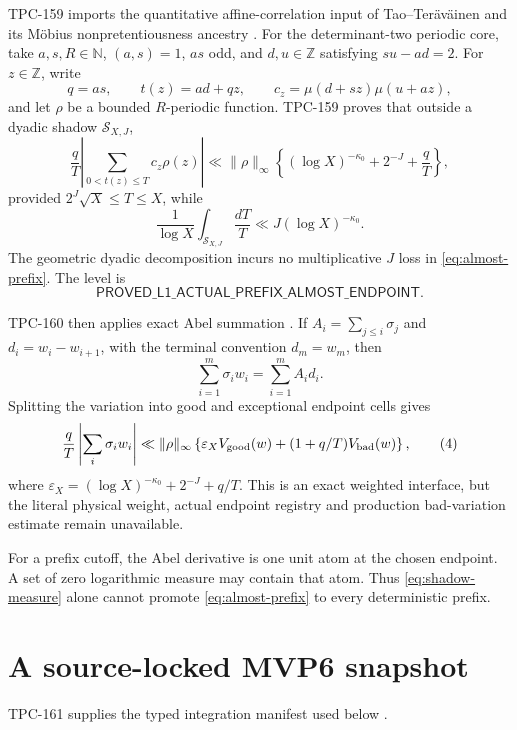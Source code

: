 \documentclass[11pt]{article}
\theoremstyle{definition}
\theoremstyle{remark}
\begin{document}
TPC-159 imports the quantitative affine-correlation input of
Tao--Ter\"av\"ainen and its M\"obius nonpretentiousness ancestry
\citep{TaoTeravainen2026,MatomakiRadziwillTao2015,WangTPC159}.
For the determinant-two periodic core, take
\(a,s,R\in\mathbb N\), \((a,s)=1\), \(as\) odd, and
\(d,u\in\mathbb Z\) satisfying \(su-ad=2\).  For \(z\in\mathbb Z\),
write
\[
 q=as,\qquad t(z)=ad+qz,\qquad
 c_z=\mu(d+sz)\mu(u+az),
\]
and let \(\rho\) be a bounded \(R\)-periodic function.  TPC-159 proves
that outside a dyadic shadow \(\mathcal S_{X,J}\),
\[
 \frac qT
 \left|
   \sum_{0<t(z)\leq T} c_z\rho(z)
 \right|
 \ll
 \|\rho\|_\infty
 \left\{
  (\log X)^{-\kappa_0}+2^{-J}+\frac qT
 \right\},
\tag{1}\label{eq:almost-prefix}
\]
provided \(2^J\sqrt X\leq T\leq X\), while
\[
 \frac1{\log X}\int_{\mathcal S_{X,J}}\frac{dT}{T}
 \ll J(\log X)^{-\kappa_0}.
\tag{2}\label{eq:shadow-measure}
\]
The geometric dyadic decomposition incurs no multiplicative \(J\)
loss in \cref{eq:almost-prefix}.  The level is
\[
 \mathsf{PROVED\_L1\_ACTUAL\_PREFIX\_ALMOST\_ENDPOINT}.
\]

TPC-160 then applies exact Abel summation
\citep{WangTPC160}.  If \(A_i=\sum_{j\leq i}\sigma_j\) and
\(d_i=w_i-w_{i+1}\), with the terminal convention \(d_m=w_m\), then
\[
 \sum_{i=1}^{m}\sigma_iw_i=\sum_{i=1}^{m}A_id_i.
\tag{3}\label{eq:abel}
\]
Splitting the variation into good and exceptional endpoint cells gives
\[
 \frac qT\left|\sum_i\sigma_iw_i\right|
 \ll \|\rho\|_\infty
 \left\{
   \varepsilon_X V_{\rm good}(w)
   +(1+q/T)V_{\rm bad}(w)
 \right\},
\tag{4}\label{eq:weighted-interface}
\]
where
\(\varepsilon_X=(\log X)^{-\kappa_0}+2^{-J}+q/T\).
This is an exact weighted interface, but the literal physical weight,
actual endpoint registry and production bad-variation estimate remain
unavailable.

For a prefix cutoff, the Abel derivative is one unit atom at the
chosen endpoint.  A set of zero logarithmic measure may contain that
atom.  Thus \cref{eq:shadow-measure} alone cannot promote
\cref{eq:almost-prefix} to every deterministic prefix.

\section{A source-locked MVP6 snapshot}

TPC-161 supplies the typed integration manifest used below
\citep{WangTPC161}.
\end{document}
